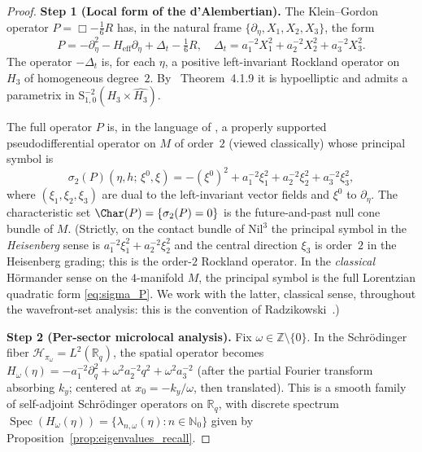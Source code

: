 \documentclass[11pt, a4paper]{article}
\newcommand{\RR}{\mathbb{R}}
\newcommand{\ZZ}{\mathbb{Z}}
\newcommand{\NN}{\mathbb{N}}
\newcommand{\Hgroup}{H_3}
\newcommand{\Nil}{\mathrm{Nil}^3}
\newcommand{\piom}{\pi_\omega}
\newcommand{\Spec}{\operatorname{Spec}}
\newcommand{\lam}{\lambda}
\newcommand{\om}{\omega}
\newcommand{\sixth}{\tfrac{1}{6}}
\newcommand{\Sym}{\mathrm{S}}
\newcommand{\dGhat}{\widehat{\Hgroup}}
\begin{document}
\begin{proof}
\textbf{Step 1 (Local form of the d'Alembertian).}
The Klein--Gordon operator $P=\Box-\tfrac{1}{6}R$ has, in the natural
frame $\{\partial_\eta,X_1,X_2,X_3\}$, the form
\begin{equation}\label{eq:P_split}
  P = -\partial_\eta^2 - H_{\mathrm{eff}}\partial_\eta + \Delta_t -\sixth R,
  \quad
  \Delta_t = a_1^{-2}X_1^2 + a_2^{-2}X_2^2 + a_3^{-2}X_3^2.
\end{equation}
The operator $-\Delta_t$ is, for each $\eta$, a positive left-invariant
Rockland operator on $\Hgroup$ of homogeneous degree~$2$. By
\cite{FR16}~Theorem~4.1.9 it is hypoelliptic and admits a parametrix in
$\Sym^{-2}_{1,0}(\Hgroup\times\dGhat)$.

The full operator $P$ is, in the language of \cite{HormIII}, a properly
supported pseudodifferential operator on $M$ of order~$2$ (viewed
classically) whose principal symbol is
\begin{equation}\label{eq:sigma_P}
  \sigma_2(P)(\eta,h;\,\xi^0,\xi)
  = -(\xi^0)^2 + a_1^{-2}\xi_1^2 + a_2^{-2}\xi_2^2 + a_3^{-2}\xi_3^2,
\end{equation}
where $(\xi_1,\xi_2,\xi_3)$ are dual to the left-invariant vector fields
and $\xi^0$ to $\partial_\eta$. The characteristic set
$\Char(P) = \{\sigma_2(P)=0\}$ is the future-and-past null cone bundle of
$M$. (Strictly, on the contact bundle of $\Nil$ the principal symbol in the
\emph{Heisenberg} sense is $a_1^{-2}\xi_1^2+a_2^{-2}\xi_2^2$ and the central
direction $\xi_3$ is order~$2$ in the Heisenberg grading; this is the
order-$2$ Rockland operator. In the \emph{classical} Hörmander sense on the
$4$-manifold $M$, the principal symbol is the full Lorentzian quadratic form
\eqref{eq:sigma_P}. We work with the latter, classical sense, throughout
the wavefront-set analysis: this is the convention of Radzikowski~\cite{Rad96}.)

\textbf{Step 2 (Per-sector microlocal analysis).}
Fix $\om\in\ZZ\setminus\{0\}$. In the Schrödinger fiber $\mathcal H_{\piom}=L^2(\RR_q)$,
the spatial operator becomes
$H_\om(\eta) = -a_1^{-2}\partial_q^2 + \om^2 a_2^{-2}q^2 + \om^2 a_3^{-2}$
(after the partial Fourier transform absorbing $k_y$; centered at
$x_0 = -k_y/\om$, then translated). This is a smooth family of
self-adjoint Schrödinger operators on $\RR_q$, with discrete spectrum
$\Spec(H_\om(\eta)) = \{\lam_{n,\om}(\eta) : n\in\NN_0\}$ given by
Proposition~\ref{prop:eigenvalues_recall}.


\end{proof}
\end{document}
